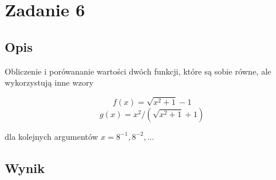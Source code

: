 \documentclass[12pt, letterpaper]{article}
\begin{document}
\section{Zadanie 6}

\subsection{Opis}

Obliczenie i porówananie wartości dwóch funkcji, które są sobie równe, ale
wykorzystują inne wzory

\[ f(x) = \sqrt{x^2 + 1} - 1 \]
\[ g(x) = x^2 / {(\sqrt{x^2 + 1} + 1)} \]

dla kolejnych argumentów $x = 8^{-1}, 8^{-2},...$

\subsection{Wynik}
\end{document}
